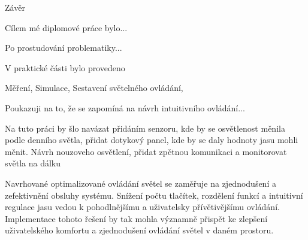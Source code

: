 \chap Závěr

Cílem mé diplomové práce bylo...

Po prostudování problematiky...

V praktické části bylo provedeno

Měření, Simulace, Sestavení světelného ovládání,

Poukazuji na to, že se zapomíná na návrh intuitivního ovládání...

Na tuto práci by šlo navázat přidáním senzoru, kde by se osvětlenost měnila podle denního světla, přidat dotykový panel, kde by se daly hodnoty
jasu mohli měnit. Návrh nouzoveho osvětlení, přidat zpětnou komunikaci a monitorovat světla na dálku

Navrhované optimalizované ovládání světel se zaměřuje na zjednodušení a zefektivnění obsluhy systému.
Snížení počtu tlačítek, rozdělení funkcí a intuitivní regulace jasu vedou
k pohodlnějšímu a uživatelsky přívětivějšímu ovládání.
Implementace tohoto řešení by tak mohla významně přispět
ke zlepšení uživatelského komfortu a zjednodušení ovládání světel v daném prostoru.

